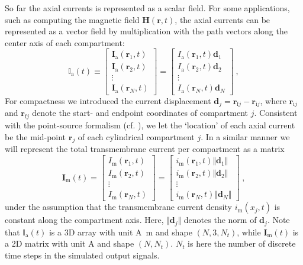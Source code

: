 So far\sntxt{,} the axial currents is represented as a scalar field.
For some applications, such as computing the magnetic field $\mathbf{H}(\mathbf{r}, t)$,
the axial currents can be represented as a vector field by multiplication with the path vectors along the center axis of each compartment:
%
\begin{equation}
\mathbb{I}_\text{a}(t) \equiv
\begin{bmatrix}
\mathbf{I}_\text{a}(\mathbf{r}_1, t)\\
\mathbf{I}_\text{a}(\mathbf{r}_2, t)\\
\vdots \\
\mathbf{I}_\text{a}(\mathbf{r}_N, t)
\end{bmatrix}
=
\begin{bmatrix}
I_\text{a}(\mathbf{r}_1, t) \mathbf{d}_1 \\
I_\text{a}(\mathbf{r}_2, t) \mathbf{d}_2 \\
\vdots \\
I_\text{a}(\mathbf{r}_N, t) \mathbf{d}_N
\end{bmatrix} ~,
\end{equation}
%
For compactness\sntxt{,} we introduced the current displacement $\mathbf{d}_j=\mathbf{r}_{\text{f}j} - \mathbf{r}_{\text{i}j}$,
where $\mathbf{r}_{\text{i}j}$ and $\mathbf{r}_{\text{f}j}$ denote the start- and endpoint coordinates of compartment $j$.
Consistent with the point-source formalism (cf. ),
we let the `location' of each axial current be the mid-point $\mathbf{r}_j$ of each cylindrical compartment $j$.
In a similar manner we will represent the total transmembrane current per compartment as a matrix
\begin{equation}
\mathbf{I}_\text{m}(t) =
\begin{bmatrix}
I_\text{m}(\mathbf{r}_1, t) \\
I_\text{m}(\mathbf{r}_2, t) \\
\vdots \\
I_\text{m}(\mathbf{r}_N, t)
\end{bmatrix}
=
\begin{bmatrix}
i_\text{m}(\mathbf{r}_1, t) \Vert \mathbf{d}_1 \Vert \\
i_\text{m}(\mathbf{r}_2, t) \Vert \mathbf{d}_2 \Vert \\
\vdots \\
i_\text{m}(\mathbf{r}_N, t) \Vert \mathbf{d}_N \Vert
\end{bmatrix} ~,
\end{equation}
under the assumption that the transmembrane current density $i_\text{m}(x_j, t)$ is constant along the compartment axis.
Here, $\Vert\mathbf{d}_j \Vert$ denotes the norm of $\mathbf{d}_j$.
Note that $\mathbb{I}_\text{a}(t)$ is a 3D array with unit \si{\ampere \metre} and shape $(N, 3, N_t)$,
while $\mathbf{I}_\text{m}(t)$ is a 2D matrix with unit \si{A} and shape $(N, N_t)$.
$N_t$ is here the number of discrete time steps in the simulated output signals.


